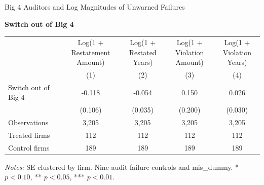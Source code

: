\documentclass[10pt]{article}
\begin{document}
\fontsize{10}{12}\selectfont
\setlength{\tabcolsep}{3pt}\renewcommand{\arraystretch}{1.15}
\begin{center}\large Big 4 Auditors and Log Magnitudes of Unwarned Failures\end{center}
\medskip\textbf{Switch out of Big 4}\par\smallskip
\begin{tabular*}{\textwidth}{@{\extracolsep{\fill}}lcccc@{}}
\toprule
 & \shortstack{Log(1 +\\Restatement Amount)} & \shortstack{Log(1 +\\Restated Years)} & \shortstack{Log(1 +\\Violation Amount)} & \shortstack{Log(1 +\\Violation Years)} \\
 & (1) & (2) & (3) & (4) \\
\midrule
Switch out of Big 4 & -0.118 & -0.054 & 0.150 & 0.026 \\
 & (0.106) & (0.035) & (0.200) & (0.030) \\
Observations & 3,205 & 3,205 & 3,205 & 3,205 \\
Treated firms & 112 & 112 & 112 & 112 \\
Control firms & 189 & 189 & 189 & 189 \\
\bottomrule\end{tabular*}\par
\medskip\fontsize{9}{11}\selectfont\textit{Notes:} SE clustered by firm. Nine audit-failure controls and mis\_dummy. * $p<0.10$, ** $p<0.05$, *** $p<0.01$.
\end{document}

